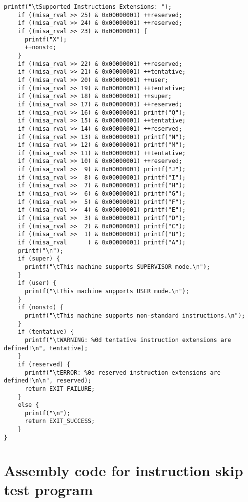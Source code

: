\begin{lstlisting}[caption={Sanity test for the cores.}, label=lst:sample_code]
    printf("\tSupported Instructions Extensions: ");
    if ((misa_rval >> 25) & 0x00000001) ++reserved;
    if ((misa_rval >> 24) & 0x00000001) ++reserved;
    if ((misa_rval >> 23) & 0x00000001) {
      printf("X");
      ++nonstd;
    }
    if ((misa_rval >> 22) & 0x00000001) ++reserved;
    if ((misa_rval >> 21) & 0x00000001) ++tentative;
    if ((misa_rval >> 20) & 0x00000001) ++user;
    if ((misa_rval >> 19) & 0x00000001) ++tentative;
    if ((misa_rval >> 18) & 0x00000001) ++super;
    if ((misa_rval >> 17) & 0x00000001) ++reserved;
    if ((misa_rval >> 16) & 0x00000001) printf("Q");
    if ((misa_rval >> 15) & 0x00000001) ++tentative;
    if ((misa_rval >> 14) & 0x00000001) ++reserved;
    if ((misa_rval >> 13) & 0x00000001) printf("N");
    if ((misa_rval >> 12) & 0x00000001) printf("M");
    if ((misa_rval >> 11) & 0x00000001) ++tentative;
    if ((misa_rval >> 10) & 0x00000001) ++reserved;
    if ((misa_rval >>  9) & 0x00000001) printf("J");
    if ((misa_rval >>  8) & 0x00000001) printf("I");
    if ((misa_rval >>  7) & 0x00000001) printf("H");
    if ((misa_rval >>  6) & 0x00000001) printf("G");
    if ((misa_rval >>  5) & 0x00000001) printf("F");
    if ((misa_rval >>  4) & 0x00000001) printf("E");
    if ((misa_rval >>  3) & 0x00000001) printf("D");
    if ((misa_rval >>  2) & 0x00000001) printf("C");
    if ((misa_rval >>  1) & 0x00000001) printf("B");
    if ((misa_rval      ) & 0x00000001) printf("A");
    printf("\n");
    if (super) {
      printf("\tThis machine supports SUPERVISOR mode.\n");
    }
    if (user) {
      printf("\tThis machine supports USER mode.\n");
    }
    if (nonstd) {
      printf("\tThis machine supports non-standard instructions.\n");
    }
    if (tentative) {
      printf("\tWARNING: %0d tentative instruction extensions are defined!\n", tentative);
    }
    if (reserved) {
      printf("\tERROR: %0d reserved instruction extensions are defined!\n\n", reserved);
      return EXIT_FAILURE;
    }
    else {
      printf("\n");
      return EXIT_SUCCESS;
    }
}

\end{lstlisting}

\section{Assembly code for instruction skip test program}
\label{app:skip_asm}



